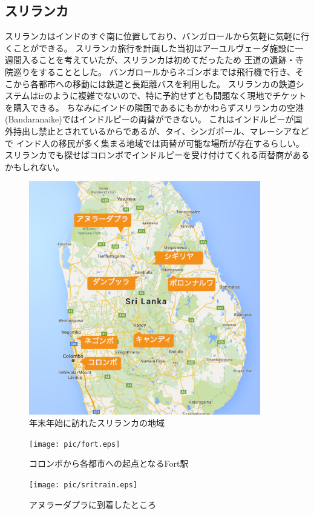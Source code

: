 \subsection{スリランカ}
スリランカはインドのすぐ南に位置しており、バンガロールから気軽に気軽に行くことができる。
スリランカ旅行を計画した当初はアーユルヴェーダ施設に一週間入ることを考えていたが、スリランカは初めてだったため
王道の遺跡・寺院巡りをすることとした。
バンガロールからネゴンボまでは飛行機で行き、そこから各都市への移動には鉄道と長距離バスを利用した。
スリランカの鉄道システムは\acrlong{ir}のように複雑でないので、特に予約せずとも問題なく現地でチケットを購入できる。
ちなみにインドの隣国であるにもかかわらずスリランカの空港(Bandaranaike)ではインドルピーの両替ができない。
これはインドルピーが国外持出し禁止とされているからであるが、タイ、シンガポール、マレーシアなどで
インド人の移民が多く集まる地域では両替が可能な場所が存在するらしい。
スリランカでも探せばコロンボでインドルピーを受け付けてくれる両替商があるかもしれない。
\begin{figure}[ht]
  \centering
  \includegraphics[width=0.9\textwidth]{pic/srilanka.eps}
  \caption{年末年始に訪れたスリランカの地域}
\end{figure}
\begin{figure}[H]
  \begin{minipage}{0.5\hsize}
  \begin{center}
    \texttt{[image: pic/fort.eps]}
  \end{center}
  \caption{コロンボから各都市への起点となるFort駅}
  \end{minipage}
  \begin{minipage}{0.5\hsize}
  \begin{center}
    \texttt{[image: pic/sritrain.eps]}
  \end{center}
  \caption{アヌラーダプラに到着したところ}
  \end{minipage}
\end{figure}

